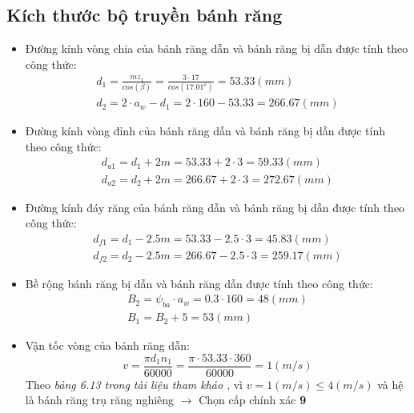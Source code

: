         \subsection{Kích thước bộ truyền bánh răng}
            \begin{itemize}
                \item Đường kính vòng chia của bánh răng dẫn và bánh răng bị dẫn được tính theo công thức:
                    \begin{gather*}
                        d_1 = \frac{mz_1}{cos(\beta)} = \frac{3 \cdot 17}{cos(17.01^o)} = 53.33 (mm)  \\
                        d_2 = 2 \cdot a_w - d_1 = 2 \cdot 160 - 53.33 = 266.67 (mm) 
                    \end{gather*}
                \item Đường kính vòng đỉnh của bánh răng dẫn và bánh răng bị dẫn được tính theo công thức:
                    \begin{gather*}
                        d_{a1} = d_1 + 2m = 53.33 + 2 \cdot 3 = 59.33  (mm)\\
                        d_{a2} = d_2 + 2m = 266.67 + 2 \cdot 3 = 272.67 (mm)
                    \end{gather*}
                \item Đường kính đáy răng của bánh răng dẫn và bánh răng bị dẫn được tính theo công thức:
                    \begin{gather*}
                        d_{f1} = d_1 - 2.5m = 53.33 - 2.5 \cdot 3 = 45.83 (mm) \\
                        d_{f2} = d_2 - 2.5m = 266.67 - 2.5 \cdot 3 = 259.17 (mm)
                    \end{gather*}
                \item Bề rộng bánh răng bị dẫn và bánh răng dẫn được tính theo công thức:
                    \begin{gather*}
                        B_2 = \psi_{ba} \cdot a_w = 0.3 \cdot 160 = 48 (mm)\\
                        B_1 = B_2 + 5 = 53 (mm)
                    \end{gather*}
                \item Vận tốc vòng của bánh răng dẫn:
            $$v = \frac{\pi d_1n_1}{60000} = \frac{\pi \cdot 53.33 \cdot 360}{60000} = 1 (m/s)$$
            Theo \textit{bảng 6.13 trong tài liệu tham khảo \cite{tltk1}}, vì $v = 1 (m/s) \leq 4 (m/s)$ và hệ là bánh răng trụ răng nghiêng $\rightarrow$ Chọn cấp chính xác \textbf{9}
            \end{itemize}
